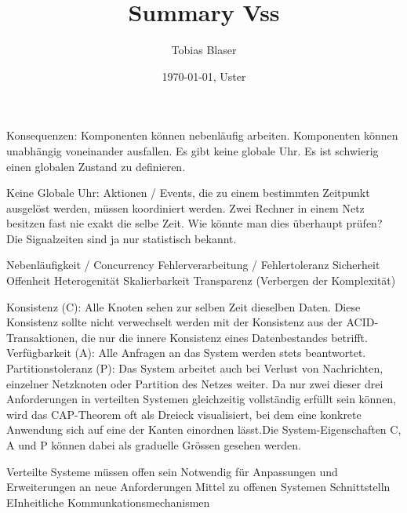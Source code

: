 \documentclass[ngerman,a4paper,12pt]{scrreprt}
\title{Summary Vss}
\author{Tobias Blaser}
\date{\today{}, Uster}
\begin{document}
\tableofcontents
\clearpage



Konsequenzen:
\ul
	\li Komponenten können nebenläufig arbeiten.
	\li Komponenten können unabhängig voneinander ausfallen.
	\li Es gibt keine globale Uhr. 
	\li Es ist schwierig einen globalen Zustand zu definieren.
\ulE

Keine Globale Uhr:
\ul
	\li Aktionen / Events, die zu einem bestimmten Zeitpunkt ausgelöst werden, müssen koordiniert werden.
	\li Zwei Rechner in einem Netz besitzen fast nie exakt die selbe Zeit.
	\li Wie könnte man dies überhaupt prüfen? Die Signalzeiten sind ja nur statistisch bekannt.
\ulE

\ul
	\li Nebenläufigkeit / Concurrency
	\li Fehlerverarbeitung / Fehlertoleranz
	\li Sicherheit
	\li Offenheit
	\li Heterogenität
	\li Skalierbarkeit
	\li Transparenz (Verbergen der Komplexität)
\ulE


\ul
	\li Konsistenz (C): Alle Knoten sehen zur selben Zeit dieselben Daten. Diese
Konsistenz sollte nicht verwechselt werden mit der Konsistenz aus der
ACID-Transaktionen, die nur die innere Konsistenz eines Datenbestandes
betrifft.
	\li Verfügbarkeit (A): Alle Anfragen an das System werden stets beantwortet.
	\li Partitionstoleranz (P): Das System arbeitet auch bei Verlust von
Nachrichten, einzelner Netzknoten oder Partition des Netzes weiter.
	\li Da nur zwei dieser drei Anforderungen in verteilten Systemen gleichzeitig
vollständig erfüllt sein können, wird das CAP-Theorem oft als Dreieck
visualisiert, bei dem eine konkrete Anwendung sich auf eine der Kanten
einordnen lässt.Die System-Eigenschaften C, A und P können dabei als
graduelle Grössen gesehen werden.

\ulE

Verteilte Systeme müssen offen sein
\ul
	\li Notwendig für Anpassungen und Erweiterungen an neue Anforderungen
	\li Mittel zu offenen Systemen
		\ul
			\li Schnittstelln
			\li EInheitliche Kommunkationsmechanismen
		\ulE
\ulE
\end{document}
